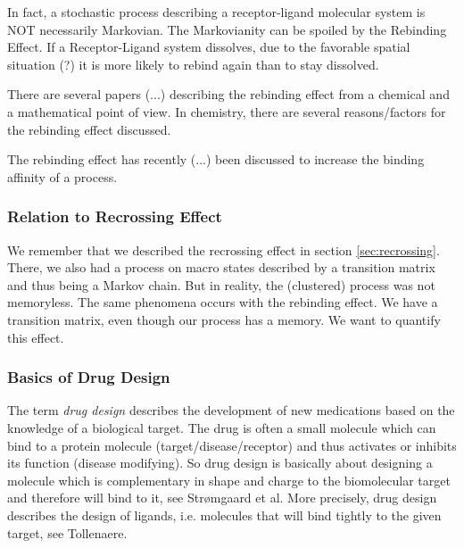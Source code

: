 In fact, a stochastic process describing a receptor-ligand molecular system is NOT necessarily Markovian. The Markovianity can be spoiled by the Rebinding Effect. If a Receptor-Ligand system dissolves, due to the favorable spatial situation (?) it is more likely to rebind again than to stay dissolved. %

There are several papers (...) describing the rebinding effect from a chemical and a mathematical point of view. In chemistry, there are several reasons/factors for the rebinding effect discussed.

The rebinding effect has recently (...) been discussed to increase the binding affinity of a process.

\subsubsection*{Relation to Recrossing Effect}
We remember that we described the recrossing effect in section \ref{sec:recrossing}. There, we also had a process on macro states described by a transition matrix and thus being a Markov chain. But in reality, the (clustered) process was not memoryless.
The same phenomena occurs with the rebinding effect. We have a transition matrix, even though our process has a memory. We want to quantify this effect.

\subsubsection*{Basics of Drug Design}
The term \textit{drug design} describes the development of new medications based on the knowledge of a
biological target. The drug is often a small molecule which can bind to a protein molecule (target/disease/receptor) and thus activates or inhibits its function (disease modifying). So drug design is basically about designing a molecule which is
complementary in shape and charge to the biomolecular target and therefore will bind to it, see Str{\o}mgaard et al\cite{stromgaard2002}.
More precisely, drug design describes the design of ligands, i.e. molecules that will bind tightly to the given target, see Tollenaere\cite{tollenaere1996}.

